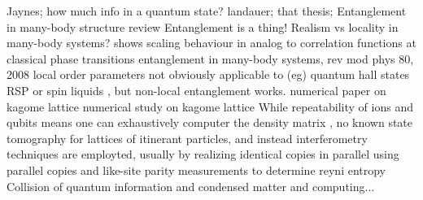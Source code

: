Jaynes; how much info in a quantum state? landauer; that thesis; 
Entanglement in many-body structure
	\cite{amico08} review 
	Entanglement is a thing!%
	Realism vs locality in many-body systems?
		\cite{osborne02}%
		\cite{osterloh02}%
			shows scaling behaviour in analog to correlation functions at classical phase transitions
		\cite{amico08} entanglement in many-body systems, rev mod phys 80, 2008
	local order parameters not obviously applicable to (eg) quantum hall states RSP 
		\cite{jiang12}%
	or spin liquids , but non-local entanglement works. 
		\cite{isakov11}%
			numerical paper on kagome lattice
		\cite{jiang12}%
			numerical study on kagome lattice
	While repeatability of ions and qubits means one can exhaustively computer the density matrix , 
		\cite{neill16}%
	no known state tomography for lattices of itinerant particles, 
	and instead interferometry techniques are employted, usually by realizing identical copies in parallel
		\cite{brydges19}%
		\cite{daley12}%
			using parallel copies and like-site parity measurements to determine reyni entropy
		\cite{mouraalves04}%
		\cite{palmer05}%
	Collision of quantum information and condensed matter and computing...
		\cite{bakr11}%
		\cite{rodriguez-briones17}%
		\cite{boyin02}%


